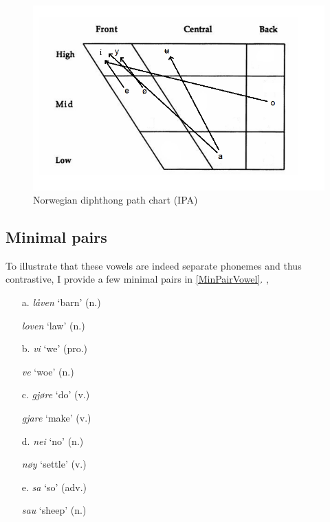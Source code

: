 \documentclass{article}
\begin{document}
\begin{figure}[h]
    \centering
    \includegraphics[scale=.6]{images/diph.PNG}
    \caption{Norwegian diphthong path chart (IPA)}
    \label{DiphChart}
\end{figure}

\subsection{Minimal pairs}
To illustrate that these vowels are indeed separate phonemes and thus contrastive, I provide a few minimal pairs in \ref{MinPairVowel}. \cite{RhinoSpike}, \cite{Norwegian101}

\begin{exe}
    \ex
    \label{MinPairVowel}
    \begin{multicols}{2}
    \begin{itemize}
        \item [a.] \textit{låven}  `barn' (n.)
        \item [] \textit{loven}  `law' (n.)
        \item [b.] \textit{vi}  `we' (pro.)
        \item [] \textit{ve}  `woe' (n.)
        \item [c.] \textit{gjøre}  `do' (v.)
        \item [] \textit{gjare}  `make' (v.)\columnbreak
        \item [d.] \textit{nei}  `no' (n.)
        \item [] \textit{nøy}  `settle' (v.)
        \item [e.] \textit{sa}  `so' (adv.)
        \item [] \textit{sau}  `sheep' (n.)
        
    \end{itemize}
    \end{multicols}
\end{exe}
\end{document}
